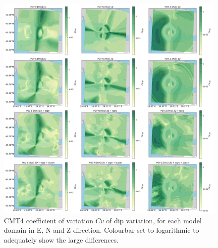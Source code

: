 \documentclass[../Text/00main.tex]{subfiles}
\begin{document}
\begin{figure}[!h]
    \centering
    \includegraphics[width=1\linewidth]{images_results/dip_variation_sigma_sc4.png}
    \caption{CMT4 coefficient of variation $Cv$ of dip variation, for each model domain in E, N and Z direction. Colourbar set to logarithmic to adequately show the large differences.}
    \label{fig:cmt3sigm}
\end{figure}

\FloatBarrier
\end{document}
